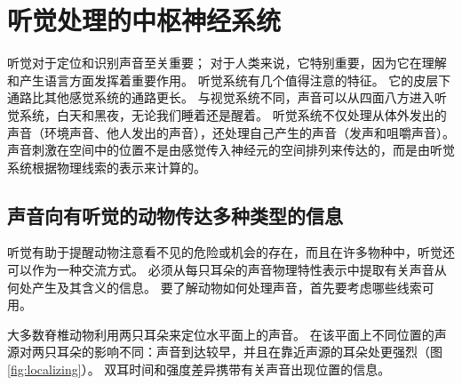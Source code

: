 \chapter{听觉处理的中枢神经系统}
听觉对于定位和识别声音至关重要； 对于人类来说，它特别重要，因为它在理解和产生语言方面发挥着重要作用。 听觉系统有几个值得注意的特征。 它的皮层下通路比其他感觉系统的通路更长。 与视觉系统不同，声音可以从四面八方进入听觉系统，白天和黑夜，无论我们睡着还是醒着。 听觉系统不仅处理从体外发出的声音（环境声音、他人发出的声音），还处理自己产生的声音（发声和咀嚼声音）。 声音刺激在空间中的位置不是由感觉传入神经元的空间排列来传达的，而是由听觉系统根据物理线索的表示来计算的。

\section{声音向有听觉的动物传达多种类型的信息}
听觉有助于提醒动物注意看不见的危险或机会的存在，而且在许多物种中，听觉还可以作为一种交流方式。 必须从每只耳朵的声音物理特性表示中提取有关声音从何处产生及其含义的信息。 要了解动物如何处理声音，首先要考虑哪些线索可用。

大多数脊椎动物利用两只耳朵来定位水平面上的声音。 在该平面上不同位置的声源对两只耳朵的影响不同：声音到达较早，并且在靠近声源的耳朵处更强烈（图\ref{fig:localizing}）。 双耳时间和强度差异携带有关声音出现位置的信息。

